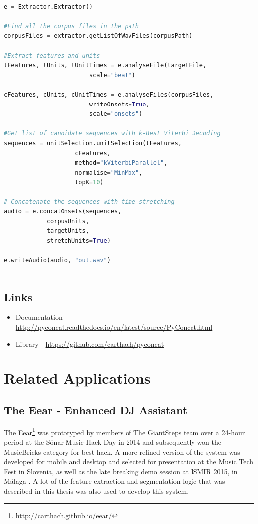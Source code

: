 \small
\begin{lstlisting}[language=Python]

e = Extractor.Extractor()

#Find all the corpus files in the path
corpusFiles = extractor.getListOfWavFiles(corpusPath)

#Extract features and units
tFeatures, tUnits, tUnitTimes = e.analyseFile(targetFile, 
						scale="beat")
						
cFeatures, cUnits, cUnitTimes = e.analyseFiles(corpusFiles, 
						writeOnsets=True, 
						scale="onsets")

#Get list of candidate sequences with k-Best Viterbi Decoding 
sequences = unitSelection.unitSelection(tFeatures, 
					cFeatures, 
					method="kViterbiParallel", 
					normalise="MinMax", 
					topK=10)

# Concatenate the sequences with time stretching
audio = e.concatOnsets(sequences, 
			corpusUnits, 
			targetUnits, 
			stretchUnits=True)	
							   
e.writeAudio(audio, "out.wav")
 
\end{lstlisting}

\normalsize

\section{Links}

\begin{itemize}
  \item Documentation - \url{http://pyconcat.readthedocs.io/en/latest/source/PyConcat.html}
  \item Library - \url{https://github.com/carthach/pyconcat}
\end{itemize}

\chapter{Related Applications}
\label{app:related_applications}

\section{The Eear - Enhanced DJ Assistant}

The Eear\footnote{\url{http://carthach.github.io/eear/}} was prototyped by members of The GiantSteps team over a 24-hour period at the Sónar Music Hack Day in 2014 and subsequently won the MusicBricks category for best hack. A more refined version of the system was developed for mobile and desktop and selected for presentation at the Music Tech Fest in Slovenia, as well as the late breaking demo session at ISMIR 2015, in Málaga \citep{ONuanain2015}. A lot of the feature extraction and segmentation logic that was described in this thesis was also used to develop this system.

